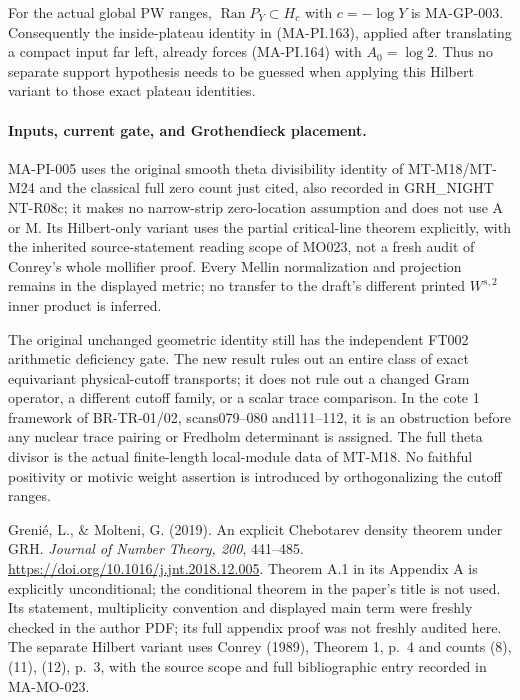 For the actual global PW ranges,
$\operatorname{Ran}P_Y\subset H_{c}$ with $c=-\log Y$
is MA-GP-003.  Consequently the inside-plateau identity
in (MA-PI.163), applied after translating a compact
input far left, already forces (MA-PI.164) with
$A_0=\log2$.  Thus no separate support hypothesis
needs to be guessed when applying this Hilbert
variant to those exact plateau identities.

\paragraph{Inputs, current gate, and Grothendieck placement.}
MA-PI-005 uses the original smooth theta divisibility
identity of MT-M18/MT-M24 and the classical full zero
count just cited, also recorded in GRH\_NIGHT NT-R08c;
it makes no narrow-strip zero-location assumption and
does not use A or M.  Its Hilbert-only variant uses
the partial critical-line theorem explicitly, with
the inherited source-statement reading scope of MO023,
not a fresh audit of Conrey's whole mollifier proof.
Every Mellin normalization and projection remains in
the displayed metric; no transfer to the draft's
different printed $W^{s,2}$ inner product is inferred.

The original unchanged geometric identity still has
the independent FT002 arithmetic deficiency gate.
The new result rules out an entire class of exact
equivariant physical-cutoff transports; it does not
rule out a changed Gram operator, a different cutoff
family, or a scalar trace comparison.  In the cote 1
framework of BR-TR-01/02, scans079--080 and111--112,
it is an obstruction before any nuclear trace pairing
or Fredholm determinant is assigned.  The full theta
divisor is the actual finite-length local-module
data of MT-M18.  No faithful positivity or motivic
weight assertion is introduced by orthogonalizing
the cutoff ranges.

Greni\'e, L., \& Molteni, G. (2019). An explicit
Chebotarev density theorem under GRH.
\emph{Journal of Number Theory, 200}, 441--485.
\url{https://doi.org/10.1016/j.jnt.2018.12.005}.
Theorem A.1 in its Appendix A is explicitly unconditional;
the conditional theorem in the paper's title is not used.
Its statement, multiplicity convention and displayed main
term were freshly checked in the author PDF; its full
appendix proof was not freshly audited here.
The separate Hilbert variant uses Conrey (1989), Theorem 1,
p.~4 and counts (8), (11), (12), p.~3, with the source
scope and full bibliographic entry recorded in MA-MO-023.
